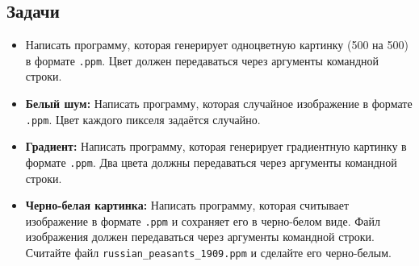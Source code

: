 \documentclass{article}
\begin{document}
\subsection*{Задачи}
\begin{itemize}
\item Написать программу, которая генерирует одноцветную картинку (500 на 500) в формате \texttt{.ppm}. Цвет должен передаваться через аргументы командной строки.
\item \textbf{Белый шум:} Написать программу, которая случайное изображение в формате \texttt{.ppm}. Цвет каждого пикселя задаётся случайно.
\item \textbf{Градиент:} Написать программу, которая генерирует градиентную картинку в формате \texttt{.ppm}. Два цвета должны передаваться через аргументы командной строки.
\item \textbf{Черно-белая картинка:} Написать программу, которая считывает изображение в формате \texttt{.ppm} и сохраняет его в черно-белом виде. Файл изображения должен передаваться через аргументы командной строки. Считайте файл \texttt{russian\_peasants\_1909.ppm} и сделайте его черно-белым.
\end{itemize}



\newpage
\end{document}
